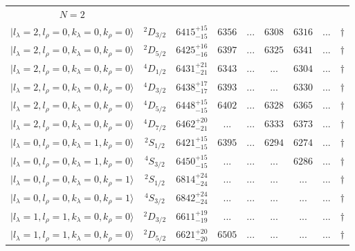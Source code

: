 \begin{tabular}{c c| c c c c c c c}
\hline
 $N=2$  &  &  &  &  &  \\ 
$\vert l_{\lambda}\!\!=\!2, l_{\rho}\!\!=\!0, k_{\lambda}\!\!=\!0, k_{\rho}\!\!=\!0 \rangle$ & $^{2}D_{3/2}$ & $6415^{+15}_{-15}$ & $6356$ & ... & $6308$ & $6316$ & ... & $\dagger$ \\ 
$\vert l_{\lambda}\!\!=\!2, l_{\rho}\!\!=\!0, k_{\lambda}\!\!=\!0, k_{\rho}\!\!=\!0 \rangle$ & $^{2}D_{5/2}$ & $6425^{+16}_{-16}$ & $6397$ & ... & $6325$ & $6341$ & ... & $\dagger$ \\ 
$\vert l_{\lambda}\!\!=\!2, l_{\rho}\!\!=\!0, k_{\lambda}\!\!=\!0, k_{\rho}\!\!=\!0 \rangle$ & $^{4}D_{1/2}$ & $6431^{+21}_{-21}$ & $6343$ & ... & ... & $6304$ & ... & $\dagger$ \\ 
$\vert l_{\lambda}\!\!=\!2, l_{\rho}\!\!=\!0, k_{\lambda}\!\!=\!0, k_{\rho}\!\!=\!0 \rangle$ & $^{4}D_{3/2}$ & $6438^{+17}_{-17}$ & $6393$ & ... & ... & $6330$ & ... & $\dagger$ \\ 
$\vert l_{\lambda}\!\!=\!2, l_{\rho}\!\!=\!0, k_{\lambda}\!\!=\!0, k_{\rho}\!\!=\!0 \rangle$ & $^{4}D_{5/2}$ & $6448^{+15}_{-15}$ & $6402$ & ... & $6328$ & $6365$ & ... & $\dagger$ \\ 
$\vert l_{\lambda}\!\!=\!2, l_{\rho}\!\!=\!0, k_{\lambda}\!\!=\!0, k_{\rho}\!\!=\!0 \rangle$ & $^{4}D_{7/2}$ & $6462^{+20}_{-21}$ & ... & ... & $6333$ & $6373$ & ... & $\dagger$ \\ 
$\vert l_{\lambda}\!\!=\!0, l_{\rho}\!\!=\!0, k_{\lambda}\!\!=\!1, k_{\rho}\!\!=\!0 \rangle$ & $^{2}S_{1/2}$ & $6421^{+15}_{-15}$ & $6395$ & ... & $6294$ & $6274$ & ... & $\dagger$ \\ 
$\vert l_{\lambda}\!\!=\!0, l_{\rho}\!\!=\!0, k_{\lambda}\!\!=\!1, k_{\rho}\!\!=\!0 \rangle$ & $^{4}S_{3/2}$ & $6450^{+15}_{-15}$ & ... & ... & ... & $6286$ & ... & $\dagger$ \\ 
$\vert l_{\lambda}\!\!=\!0, l_{\rho}\!\!=\!0, k_{\lambda}\!\!=\!0, k_{\rho}\!\!=\!1 \rangle$ & $^{2}S_{1/2}$ & $6814^{+24}_{-24}$ & ... & ... & ... & ... & ... & $\dagger$ \\ 
$\vert l_{\lambda}\!\!=\!0, l_{\rho}\!\!=\!0, k_{\lambda}\!\!=\!0, k_{\rho}\!\!=\!1 \rangle$ & $^{4}S_{3/2}$ & $6842^{+24}_{-24}$ & ... & ... & ... & ... & ... & $\dagger$ \\ 
$\vert l_{\lambda}\!\!=\!1, l_{\rho}\!\!=\!1, k_{\lambda}\!\!=\!0, k_{\rho}\!\!=\!0 \rangle$ & $^{2}D_{3/2}$ & $6611^{+19}_{-19}$ & ... & ... & ... & ... & ... & $\dagger$ \\ 
$\vert l_{\lambda}\!\!=\!1, l_{\rho}\!\!=\!1, k_{\lambda}\!\!=\!0, k_{\rho}\!\!=\!0 \rangle$ & $^{2}D_{5/2}$ & $6621^{+20}_{-20}$ & $6505$ & ... & ... & ... & ... & $\dagger$ \\ 

\end{tabular}
